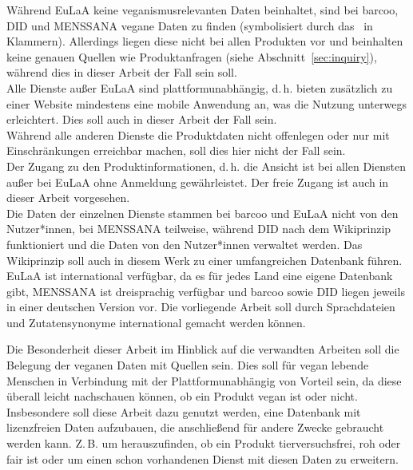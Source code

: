 Während \ac{EuLaA} keine veganismusrelevanten Daten beinhaltet, sind bei
barcoo, \ac{DID} und \ac{MENSSANA} vegane Daten zu finden
(symbolisiert durch das \cmark\ in Klammern).
Allerdings liegen diese nicht bei allen Produkten vor und beinhalten keine 
genauen Quellen wie
Produktanfragen (siehe Abschnitt~\ref{sec:inquiry}), während dies in dieser
Arbeit der Fall sein soll.\\
Alle Dienste außer \ac{EuLaA} sind plattformunabhängig, d.\,h.
bieten zusätzlich zu einer Website mindestens eine mobile Anwendung
an, was die Nutzung unterwegs erleichtert. Dies soll auch in dieser
Arbeit der Fall sein.\\
Während alle anderen
Dienste die Produktdaten nicht offenlegen oder nur mit Einschränkungen
erreichbar machen, soll dies hier nicht der Fall sein.\\
Der Zugang zu den Produktinformationen, d.\,h. die Ansicht ist bei
allen Diensten außer bei \ac{EuLaA} ohne Anmeldung
gewährleistet. Der freie Zugang ist auch in dieser Arbeit vorgesehen.\\
Die Daten der einzelnen Dienste stammen bei barcoo und 
\ac{EuLaA}
nicht von den Nutzer*innen, bei \ac{MENSSANA} teilweise, während
\ac{DID} nach dem Wikiprinzip funktioniert und die Daten von den
Nutzer*innen verwaltet werden. Das Wikiprinzip soll auch in diesem Werk zu einer 
umfangreichen Datenbank führen.\\
\ac{EuLaA} ist international verfügbar, da es für jedes Land eine
eigene Datenbank gibt, MENSSANA ist dreisprachig verfügbar und barcoo 
sowie \ac{DID} liegen jeweils in einer deutschen Version vor.
Die vorliegende Arbeit soll durch Sprachdateien und Zutatensynonyme international
gemacht werden können.

Die Besonderheit dieser Arbeit im Hinblick auf die verwandten Arbeiten soll die 
Belegung der veganen Daten mit Quellen sein. Dies soll für vegan lebende Menschen in 
Verbindung mit der Plattformunabhängig von Vorteil sein, da diese überall 
leicht 
nachschauen können, ob ein Produkt vegan ist oder nicht. Insbesondere soll 
diese Arbeit dazu genutzt werden, eine Datenbank mit lizenzfreien Daten 
aufzubauen, die anschließend für andere Zwecke gebraucht werden kann. Z.\,B. 
um herauszufinden, ob 
ein Produkt tierversuchsfrei, roh oder fair ist oder um einen schon vorhandenen 
Dienst mit diesen Daten zu erweitern.